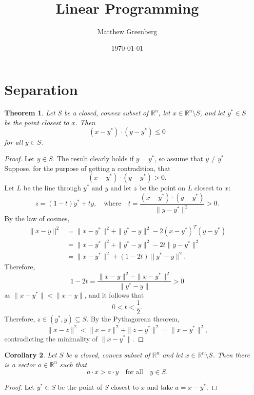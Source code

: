 \documentclass[12pt]{amsart}
\newtheorem{theorem}{Theorem}[section]
\newtheorem{corollary}[theorem]{Corollary}
\theoremstyle{definition}
\theoremstyle{remark}
\numberwithin{equation}{section}
\newcommand{\RR}{\mathbb{R}}
\begin{document}
\title{Linear Programming}

\author{Matthew Greenberg}
\date{\today}
\maketitle

\section{Separation}

\begin{theorem}
    Let $S$ be a closed, convex subset of $\RR^n$, let
    $x\in\RR^n\setminus S$, and let $y^*\in S$ be the point closest to $x$.
    Then
    \[
        (x - y^*)\cdot(y - y^*)\leq 0
    \]
    for all $y\in S$.
\end{theorem}

\begin{proof}
    Let $y\in S$.
    The result clearly holds if $y=y^*$, so assume that $y\neq y^*$.
    Suppose, for the purpose of getting a contradition, that
    \[
        (x - y^*)\cdot(y - y^*)> 0.
    \]
    Let $L$ be the line through $y^*$ and $y$ and let $z$ be the point
    on $L$ closest to $x$:
    \[
        z = (1-t)y^* + ty,\quad\text{where}\quad
        t=\frac{(x-y^*)\cdot(y-y^*)}{\|y-y^*\|^2}>0.
    \]
    By the law of cosines,
    \begin{align*}
        \|x-y\|^2 &= \|x-y^*\|^2 + \|y^*-y\|^2 - 2(x-y^*)^T(y-y^*)\\
        &= \|x-y^*\|^2 + \|y^*-y\|^2 - 2t\|y-y^*\|^2\\
        &= \|x-y^*\|^2 + (1-2t)\|y^*-y\|^2.
    \end{align*}
    Therefore,
    \[
        1-2t = \frac{\|x-y\|^2 - \|x-y^*\|^2}{\|y^*-y\|} > 0
    \]
    as $\|x-y^*\|<\|x-y\|$, and it follows that
    \[
        0 < t < \frac12.
    \] 
    Therefore, $z \in(y^*,y)\subseteq S$.
    By the Pythagorean theorem,
    \[
        \|x-z\|^2 < \|x-z\|^2 + \|z - y^*\|^2 = \|x-y^*\|^2,
    \]
    contradicting the minimality of $\|x-y^*\|$.
\end{proof}

\begin{corollary}
    Let $S$ be a closed, convex subset of $\RR^n$ and let
    $x\in\RR^n\setminus S$.
    Then there is a vector $a\in\RR^n$ such
    that
    \[
        a\cdot x > a\cdot y\quad\text{for all}\quad y\in S.
    \]
\end{corollary}
\begin{proof}
    Let $y^*\in S$ be the point of $S$ closest to $x$ and take $a = x-y^*$.
\end{proof}
\end{document}
